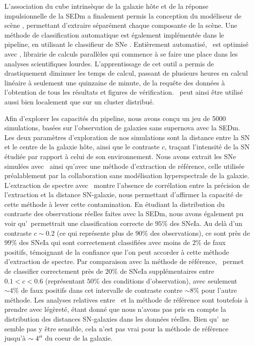 \documentclass[../main/main.tex]{subfiles}
\begin{document}
L'association du cube intrinsèque de la galaxie hôte et de la réponse
impulsionnelle de la SEDm a finalement permis la conception
du modéliseur de scène \hypergal, permettant
d'extraire séparément chaque composante de la scène. Une méthode de
classification automatique est également implémentée dans le pipeline,
en utilisant le classifieur de
SNe .
Entièrement automatisé, \hypergal\ est optimisé
avec , librairie de calculs parallèles qui commence à se faire
une place dans les analyses scientifiques lourdes. L'apprentissage de
cet outil a permis de drastiquement diminuer les temps de calcul,
passant de plusieurs heures en calcul linéaire à seulement une quinzaine de
minute, de la requête des données à l'obtention de tous les
résultats et figures de vérification. \hypergal\ peut ainsi être utilisé
aussi bien localement que sur un cluster distribué. 

Afin d'explorer les capacités du pipeline, nous avons conçu un jeu de
5000 simulations, basées sur l'observation de galaxies sans supernova
avec la SEDm. Les deux paramètres d'exploration de nos simulations sont
la distance entre la SN et le centre de la galaxie hôte, ainsi que le contraste
$c$, traçant l'intensité de la SN étudiée par rapport à celui de son
environnement. Nous avons extrait les SNe simulées avec \hypergal\
ainsi qu'avec une méthode d'extraction de référence, celle utilisée
préalablement par la collaboration sans modélisation hyperspectrale de
la galaxie. L'extraction de spectre avec \hypergal\ montre l'absence de corrélation entre la précision de
l'extraction et la distance SN-galaxie, nous permettant d'affirmer la capacité de
cette méthode à lever cette contamination. En
étudiant la distribution du contraste des observations réelles faites avec la SEDm, nous
avons également pu voir qu'\hypergal\ permettrait une classification
correcte de $95\%$ des SNeIa. Au delà d'un
contraste $c\sim0.2$ (ce qui représente plus de $90\%$ des observations), ce sont près de $99\%$ des SNeIa qui sont
correctement classifiées avec moins de $2\%$ de faux positifs,
témoignant de la confiance que l'on peut accorder à cette méthode
d'extraction de spectre.
Par comparaison avec la méthode de référence,
\hypergal\ permet de classifier correctement près de $20\%$ de SNeIa
supplémentaires entre $0.1<c<0.6$ (représentant $50\%$ des conditions
d'observation), avec seulement $\sim4\%$ de faux positifs dans cet
intervalle de contraste contre $\sim8\%$ pour l'autre méthode. Les
analyses relatives entre \hypergal\ et la méthode de référence sont
toutefois à prendre avec légèreté, étant donné que nous n'avons pas pris
en compte la distribution des distances SN-galaxies dans les données
réelles. Bien qu'\hypergal\ ne semble pas y être sensible, cela n'est
pas vrai pour la méthode de référence jusqu'à $\sim4^{\prime\prime}$ du coeur de
la galaxie.
\end{document}
